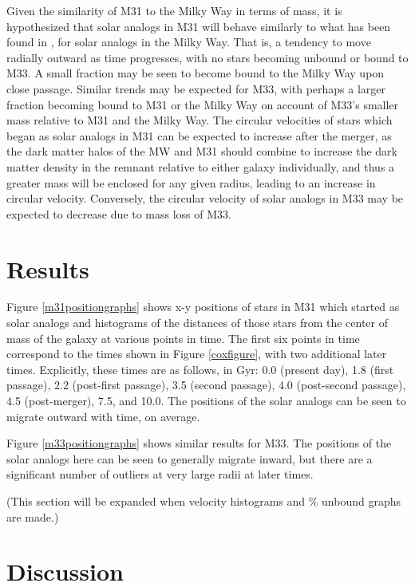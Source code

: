 \documentclass{aastex63}
\begin{document}
\indent Given the similarity of M31 to the Milky Way in terms of mass, it is hypothesized that solar analogs in M31 will behave similarly to what has been found in \cite{cox08}, \cite{van12} for solar analogs in the Milky Way. That is, a tendency to move radially outward as time progresses, with no stars becoming unbound or bound to M33. A small fraction may be seen to become bound to the Milky Way upon close passage. Similar trends may be expected for M33, with perhaps a larger fraction becoming bound to M31 or the Milky Way on account of M33's smaller mass relative to M31 and the Milky Way. The circular velocities of stars which began as solar analogs in M31 can be expected to increase after the merger, as the dark matter halos of the MW and M31 should combine to increase the dark matter density in the remnant relative to either galaxy individually, and thus a greater mass will be enclosed for any given radius, leading to an increase in circular velocity. Conversely, the circular velocity of solar analogs in M33 may be expected to decrease due to mass loss of M33. 

\section{Results}

Figure \ref{m31positiongraphs} shows x-y positions of stars in M31 which started as solar analogs and histograms of the distances of those stars from the center of mass of the galaxy at various points in time. The first six points in time correspond to the times shown in Figure \ref{coxfigure}, with two additional later times. Explicitly, these times are as follows, in Gyr: 0.0 (present day), 1.8 (first passage), 2.2 (post-first passage), 3.5 (second passage), 4.0 (post-second passage), 4.5 (post-merger), 7.5, and 10.0. The positions of the solar analogs can be seen to migrate outward with time, on average. 

Figure \ref{m33positiongraphs} shows similar results for M33. The positions of the solar analogs here can be seen to generally migrate inward, but there are a significant number of outliers at very large radii at later times. 

(This section will be expanded when velocity histograms and $\%$ unbound graphs are made.)

\section{Discussion}
\end{document}
